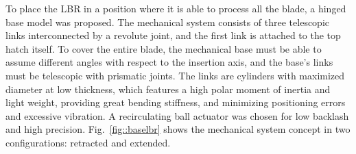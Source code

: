 

To place the LBR in a position where it is able to process all the
blade, a hinged base model was proposed. The mechanical system consists of three
telescopic links interconnected by a revolute joint, and the first link is attached to the
top hatch itself. To cover the entire blade, the mechanical base must be able to
assume different angles with respect to the insertion axis, and the base's links
must be telescopic with prismatic joints. The links are cylinders with maximized
diameter at low thickness, which features a high polar moment of inertia and
light weight, providing great bending stiffness, and minimizing positioning
errors and excessive vibration. A recirculating ball actuator was chosen for
low backlash and high precision. Fig.~\ref{fig::baselbr} shows the mechanical
system concept in two configurations: retracted and extended.



